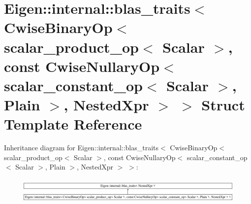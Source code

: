 \hypertarget{struct_eigen_1_1internal_1_1blas__traits_3_01_cwise_binary_op_3_01scalar__product__op_3_01_scala460c90a32ed86eb7afe907bd9f50947d}{}\section{Eigen\+::internal\+::blas\+\_\+traits$<$ Cwise\+Binary\+Op$<$ scalar\+\_\+product\+\_\+op$<$ Scalar $>$, const Cwise\+Nullary\+Op$<$ scalar\+\_\+constant\+\_\+op$<$ Scalar $>$, Plain $>$, Nested\+Xpr $>$ $>$ Struct Template Reference}
\label{struct_eigen_1_1internal_1_1blas__traits_3_01_cwise_binary_op_3_01scalar__product__op_3_01_scala460c90a32ed86eb7afe907bd9f50947d}
Inheritance diagram for Eigen\+::internal\+::blas\+\_\+traits$<$ Cwise\+Binary\+Op$<$ scalar\+\_\+product\+\_\+op$<$ Scalar $>$, const Cwise\+Nullary\+Op$<$ scalar\+\_\+constant\+\_\+op$<$ Scalar $>$, Plain $>$, Nested\+Xpr $>$ $>$\+:\begin{figure}[H]
\begin{center}
\leavevmode
\includegraphics[height=1.240310cm]{struct_eigen_1_1internal_1_1blas__traits_3_01_cwise_binary_op_3_01scalar__product__op_3_01_scala460c90a32ed86eb7afe907bd9f50947d}
\end{center}
\end{figure}
